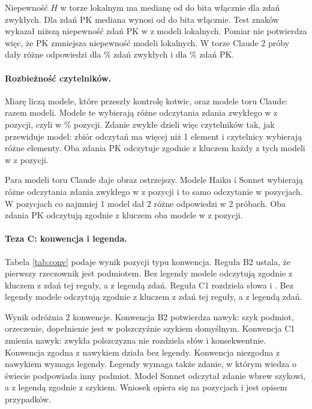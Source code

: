 Niepewność $H$ w torze lokalnym ma medianę od \pkHNatLocalMin{} do \pkHNatLocalMax{} bita
włącznie dla zdań zwykłych. Dla zdań PK mediana wynosi od \pkHPkLocalMin{} do \pkHPkLocalMax{} bita włącznie. Test znaków
wykazał niższą niepewność zdań PK w \pkSignWinsLocal{} z \pkProbeLocal{} modeli lokalnych.
Pomiar nie potwierdza więc, że PK zmniejsza niepewność modeli lokalnych. W torze Claude
2 próby dały różne odpowiedzi dla \pkUnstableNat{} \% zdań zwykłych i dla \pkUnstablePk{} \%
zdań PK.

\paragraph{Rozbieżność czytelników.}
Miarę liczą modele, które przeszły kontrolę kotwic, oraz modele toru Claude: razem
\pkProbeQualified{} modeli. Modele te wybierają różne odczytania zdania zwykłego
w \pkNatSplitCount{} z \pkAgreeItems{} pozycji, czyli w \pkNatSplit{} \% pozycji. Zdanie
zwykłe dzieli więc czytelników tak, jak przewiduje model: zbiór odczytań ma więcej niż
1 element i czytelnicy wybierają różne elementy. Oba zdania PK odczytuje zgodnie z kluczem
każdy z tych modeli w \pkPkAllCorrectCount{} z \pkAgreeItems{} pozycji.

Para modeli toru Claude daje obraz ostrzejszy. Modele Haiku i Sonnet wybierają różne
odczytania zdania zwykłego w \pkClaudeSplitCount{} z \pkClaudeItems{} pozycji i to samo
odczytanie w \pkClaudeAgreeCount{} pozycjach. W \pkClaudeUnsureCount{} pozycjach co najmniej
1 model dał 2 różne odpowiedzi w 2 próbach. Oba zdania PK odczytują zgodnie z kluczem oba
modele w \pkClaudePkBothCount{} z \pkClaudeItems{} pozycji.

\paragraph{Teza C: konwencja i legenda.}
Tabela \ref{tab:conv} podaje wynik pozycji typu konwencja. Reguła B2 ustala, że pierwszy
rzeczownik jest podmiotem. Bez legendy modele odczytują zgodnie z kluczem \pkConvOrderPlain{}
z \pkConvOrderAll{} zdań tej reguły, a z legendą \pkConvOrderLegend{} zdań. Reguła C1
rozdziela słowa  i . Bez legendy modele odczytują zgodnie z kluczem
\pkConvOrPlain{} z \pkConvOrAll{} zdań tej reguły, a z legendą \pkConvOrLegend{} zdań.

Wynik odróżnia 2 konwencje. Konwencja B2 potwierdza nawyk: szyk podmiot,
orzeczenie, dopełnienie jest w polszczyźnie szykiem domyślnym. Konwencja C1 zmienia nawyk:
zwykła polszczyzna nie rozdziela słów  i  konsekwentnie. Konwencja
zgodna z nawykiem działa bez legendy. Konwencja niezgodna z nawykiem wymaga legendy.
Legendy wymaga także zdanie, w którym wiedza o świecie podpowiada inny podmiot. Model
Sonnet odczytał zdanie  wbrew szykowi, a z legendą
zgodnie z szykiem. Wniosek opiera się na \pkItemsConv{} pozycjach i jest opisem przypadków.

